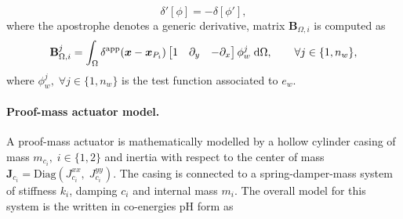 $$ \delta'[\phi]  = -\delta[\phi'],$$
where the apostrophe denotes a generic derivative, matrix $\mathbf{B}_{\Omega, i}$ is computed as
\begin{equation}
\mathbf{B}_{\Omega, i}^j = \int_\Omega  \delta^{\text{app}}(\bm{x} - \bm{x}_{P_i}) \begin{bmatrix}
1 & \partial_y & -\partial_x\\
\end{bmatrix} \phi_w^j \d{\Omega}, \qquad \forall j \in \{1,n_w\},
\end{equation}
where $\phi_w^j, \; \forall j \in \{1,n_w\}$ is the test function associated to $e_w$. 

\paragraph{Proof-mass actuator model.}
A proof-mass actuator is mathematically modelled by a hollow cylinder casing of mass $m_{c_i}, \; i \in \{1,2\}$ and inertia with respect to the center of mass $\mathbf{J}_{c_i}=\mathrm{Diag}(J_{c_i}^{xx}, \; J_{c_i}^{yy})$. The casing is connected to a spring-damper-mass system of stiffness $k_i$, damping $c_i$ and internal mass $m_i$. The overall model for this system is the written in co-energies pH form as 

